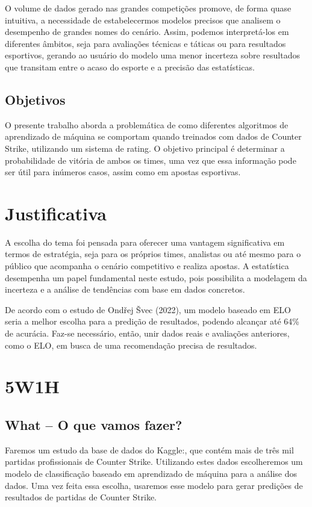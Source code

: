 \documentclass[a4paper,times,12pt]{article}
\begin{document}
O volume de dados gerado nas grandes competições promove, de forma quase intuitiva, a necessidade de estabelecermos modelos precisos que analisem o desempenho de grandes nomes do cenário. Assim, podemos interpretá-los em diferentes âmbitos, seja para avaliações técnicas e táticas ou para resultados esportivos, gerando ao usuário do modelo uma menor incerteza sobre resultados que transitam entre o acaso do esporte e a precisão das estatísticas.

\subsection{Objetivos}
\hspace{+15pt}
O presente trabalho aborda a problemática de como diferentes algoritmos de aprendizado de máquina se comportam quando treinados com dados de Counter Strike, utilizando um sistema de rating. O objetivo principal é determinar a probabilidade de vitória de ambos os times, uma vez que essa informação pode ser útil para inúmeros casos, assim como em apostas esportivas.


\section{Justificativa}
\hspace{+15pt}
A escolha do tema foi pensada para oferecer uma vantagem significativa em termos de estratégia, seja para os próprios times, analistas ou até mesmo para o público que acompanha o cenário competitivo e realiza apostas. A estatística desempenha um papel fundamental neste estudo, pois possibilita a modelagem da incerteza e a análise de tendências com base em dados concretos.

De acordo com o estudo de Ondřej Švec (2022), um modelo baseado em ELO seria a melhor escolha para a predição de resultados, podendo alcançar até 64\% de acurácia. Faz-se necessário, então, unir dados reais e avaliações anteriores, como o ELO, em busca de uma recomendação precisa de resultados.

\section{5W1H}
\subsection*{What – O que vamos fazer?}
\hspace{+15pt}
Faremos um estudo da base de dados do Kaggle:\cite{Kaggle}, que contém mais de três mil partidas profissionais de Counter Strike. 
Utilizando estes dados escolheremos um modelo de classificação baseado em aprendizado de máquina para a análise dos dados. Uma vez feita essa escolha, usaremos esse modelo para gerar predições de resultados de partidas de Counter Strike.
\end{document}
